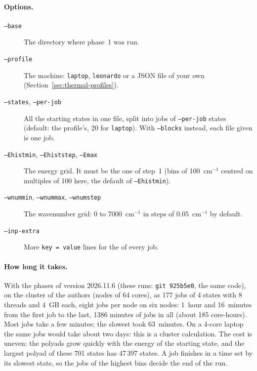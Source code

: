 \paragraph{Options.}
\begin{description}
\item[\texttt{--base}] The directory where phase~1 was run.
\item[\texttt{--profile}] The machine: \texttt{laptop}, \texttt{leonardo}
or a JSON file of your own (Section~\ref{sec:thermal-profiles}).
\item[\texttt{--states}, \texttt{--per-job}] All the starting states in
one file, split into jobs of \texttt{--per-job} states (default: the
profile's, 20 for \texttt{laptop}). With \texttt{--blocks} instead, each
file given is one job.
\item[\texttt{--Ehistmin}, \texttt{--Ehiststep}, \texttt{--Emax}] The
energy grid. It must be the one of step~1 (bins of 100~cm$^{-1}$
centred on multiples of 100 here, the default of \texttt{--Ehistmin}).
\item[\texttt{--wnummin}, \texttt{--wnummax}, \texttt{--wnumstep}] The
wavenumber grid: 0 to 7000~cm$^{-1}$ in steps of 0.05~cm$^{-1}$ by
default.
\item[\texttt{--inp-extra}] More \texttt{key = value} lines for the
 of every job.
\end{description}

\paragraph{How long it takes.} With the phases of version 2026.11.6
(these runs: \texttt{git 925b5e0}, the same code), on the cluster of the authors (nodes of
64 cores), as 177 jobs of 4 states with 8 threads and 4~GB each, eight
jobs per node on six nodes: 1~hour and 16~minutes from the first job to
the last, 1386 minutes of jobs in all (about 185 core-hours). Most jobs
take a few minutes; the slowest took 63~minutes. On a 4-core laptop the
same jobs would take about two days: this is a cluster calculation.
The cost is uneven: the polyads grow quickly with the energy of the
starting state, and the largest polyad of these 701 states has 47\,397
states. A job finishes in a time set by its slowest state, so the jobs
of the highest bins decide the end of the run.

